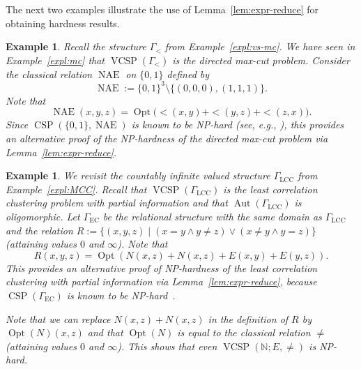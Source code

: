 \documentclass[nonacm]{acmart}
\newcommand{\N}{\mathbb N}
\DeclareMathOperator{\Aut}{Aut}
\DeclareMathOperator{\VCSP}{VCSP}
\DeclareMathOperator{\CSP}{CSP}
\DeclareMathOperator{\Opt}{Opt}
\DeclareMathOperator{\NAE}{NAE}
\newtheorem{expl}[theorem]{Example}
\begin{document}
The next two examples illustrate the use 
of Lemma~\ref{lem:expr-reduce} for obtaining hardness results. 

\begin{expl}\label{expl:mc-hard}
    Recall the structure $\Gamma_<$ from Example~\ref{expl:vs-mc}. We have seen in Example~\ref{expl:mc} that $\VCSP(\Gamma_<)$ is the directed max-cut problem. Consider the classical relation $\NAE$ on $\{0,1\}$ defined by
    \[\NAE := \{0,1\}^3 \setminus \{(0,0,0), (1,1,1)\}.\]
    Note that 
    \[\NAE(x,y,z) = \Opt \big ({<}(x,y)+{<}(y,z)+{<}(z,x) \big).\]
    Since $\CSP(\{0,1\}, \NAE)$ is known to be NP-hard (see, e.g., \cite{Book}), this provides an alternative proof of the NP-hardness of the directed max-cut problem via Lemma~\ref{lem:expr-reduce}.
\end{expl}


\begin{expl}\label{expl:mcc-hard}
We revisit the countably infinite valued structure $\Gamma_{\text{LCC}}$ from Example~\ref{expl:MCC}.  Recall that 
$\VCSP(\Gamma_{\text{LCC}})$ is the 
least correlation clustering problem with partial information 
and that $\Aut(\Gamma_{\text{LCC}})$ is oligomorphic. 
Let $\Gamma_{\text{EC}}$ be the relational structure with the same domain as 
$\Gamma_{\text{LCC}}$ and the relation $R := \{(x,y,z) \mid (x=y \wedge y \neq z) \vee (x \neq y \wedge y = z)\}$ (attaining values $0$ and $\infty$). 
Note that 
$$R(x,y,z) = \Opt(N(x,z) + N(x,z) + E(x,y) + E(y,z)).$$
This provides an alternative proof of NP-hardness of the 
least correlation clustering with partial information via Lemma~\ref{lem:expr-reduce}, 
because $\CSP(\Gamma_{\text{EC}})$ is known to be NP-hard~\cite{ecsps}.
 
Note that we can replace $N(x,z) + N(x,z)$ in the definition of $R$ by $\Opt(N)(x,z)$ and that $\Opt(N)$ is equal to the classical relation $\neq$ (attaining values $0$ and $\infty$). This shows that even $\VCSP(\N; E, \neq)$ is NP-hard.
\end{expl}
\end{document}
